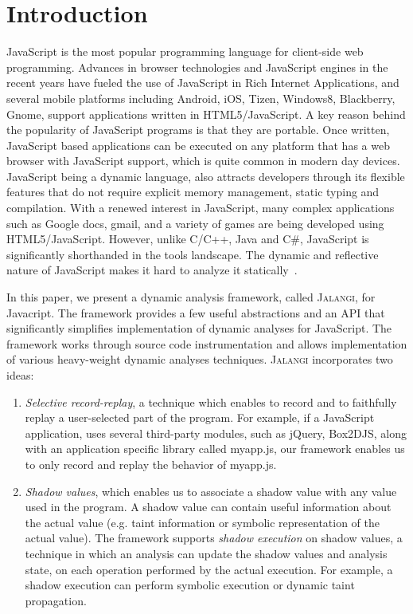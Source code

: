 \documentclass{sig-alternate}
\def\jalangi{\textsc{Jalangi}}
\begin{document}


\section{Introduction}

JavaScript is the most popular programming language for client-side
web programming. Advances in browser technologies and JavaScript
engines in the recent years have fueled the use of JavaScript in Rich
Internet Applications, and several mobile platforms including Android,
iOS, Tizen, Windows8, Blackberry, Gnome, support applications written
in HTML5/JavaScript. A key reason behind the popularity of JavaScript
programs is that they are portable. Once written, JavaScript based
applications can be executed on any platform that has a web browser
with JavaScript support, which is quite common in modern day devices.
JavaScript being a dynamic language, also attracts developers through
its flexible features that do not require explicit memory management,
static typing and compilation.  With a renewed interest in JavaScript,
many complex applications such as Google docs, gmail, and a variety of
games are being developed using HTML5/JavaScript. However, unlike
C/C++, Java and C\#, JavaScript is significantly shorthanded in the
tools landscape. The dynamic and reflective nature of JavaScript makes
it hard to analyze it
statically~\cite{Richards:2010:ADB:1806596.1806598,Wei:2012:BAJ:2384716.2384758,Ratanaworabhan:2010:JCB:1863166.1863169}.

In this paper, we present a dynamic analysis framework, called
\jalangi{}, for Javacript.  The framework provides a few useful
abstractions and an API that significantly simplifies implementation
of dynamic analyses for JavaScript.  The framework works through
source code instrumentation and allows implementation of various
heavy-weight dynamic analyses techniques.  \jalangi{} incorporates two
ideas:

\begin{enumerate}
\item \emph{Selective record-replay}, a technique which enables to record and
  to faithfully replay a user-selected part of the program.  For
  example, if a JavaScript application, uses several third-party
  modules, such as jQuery, Box2DJS, along with an application specific
  library called myapp.js, our framework enables us to only record and
  replay the behavior of myapp.js.
\item\emph{ Shadow values}, which enables us to associate a shadow
  value with any value used in the program.  A shadow value can
  contain useful information about the actual value (e.g. taint
  information or symbolic representation of the actual value).  The
  framework supports \emph{shadow execution} on shadow values, a
  technique in which an analysis can update the shadow values and
  analysis state, on each operation performed by the actual execution.
  For example, a shadow execution can perform symbolic execution or
  dynamic taint propagation.
\end{enumerate}
\end{document}
